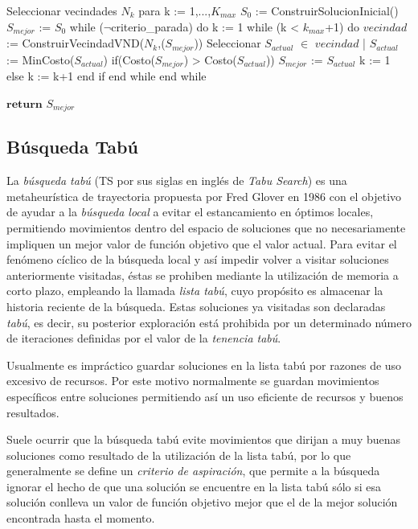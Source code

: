 \begin{code}[includerangemarker=false,frame=single,label=alg:VNS,caption=Pseudocódigo de Búsqueda Descendente en Vecindades Variables,firstnumber=100, mathescape]
Seleccionar vecindades $N_{k}$ para 
k := 1,...,$K_{max}$ 
$S_0$ := ConstruirSolucionInicial()
$S_{mejor}$ := $S_0$
while ($\neg$criterio_parada) do
    k := 1
    while (k < $k_{max}$+1) do 
    	$vecindad$ := ConstruirVecindadVND($N_{k}$,($S_{mejor}$))
		Seleccionar $S_{actual}$ $\in$ $vecindad$ | $S_{actual}$ := Min{Costo($S_{actual}$)}	
		if(Costo($S_{mejor}$) > Costo($S_{actual}$))		
			$S_{mejor}$ := $S_{actual}$
			k := 1
		else
		 k := k+1
		end if 			
	end while
end while

$\textbf{return}$ $S_{mejor}$
\end{code}

\subsection{Búsqueda Tabú} \label{subsect:ts}

La \emph{búsqueda tabú} (TS por sus siglas en inglés de \emph{Tabu Search}) es una metaheurística de trayectoria propuesta por Fred Glover en 1986 \cite{tabusearch} con el objetivo de ayudar a la \emph{búsqueda local} a evitar el estancamiento en óptimos locales, permitiendo movimientos dentro del espacio de soluciones que no necesariamente impliquen un mejor valor de función objetivo que el valor actual.
Para evitar el fenómeno cíclico de la búsqueda local y así impedir volver a visitar soluciones anteriormente visitadas, éstas se prohiben mediante la utilización de memoria a corto plazo, empleando la llamada \emph{lista tabú}, cuyo propósito es almacenar la historia reciente de la búsqueda. 
Estas soluciones ya visitadas son declaradas \emph{tabú}, es decir, su posterior exploración está prohibida por un determinado número de iteraciones definidas por el valor de la \emph{tenencia tabú}. 

Usualmente es impráctico guardar soluciones en la lista tabú por razones de uso excesivo de recursos. Por este motivo normalmente se guardan movimientos específicos entre soluciones permitiendo así un uso eficiente de recursos y buenos resultados.

Suele ocurrir que la búsqueda tabú evite movimientos que dirijan a muy buenas soluciones como resultado de la utilización de la lista tabú, por lo que generalmente se define un \emph{criterio de aspiración}, que permite a la búsqueda ignorar el hecho de que una solución se encuentre en la lista tabú sólo si esa solución conlleva un valor de función objetivo mejor que el de la mejor solución encontrada hasta el momento.

